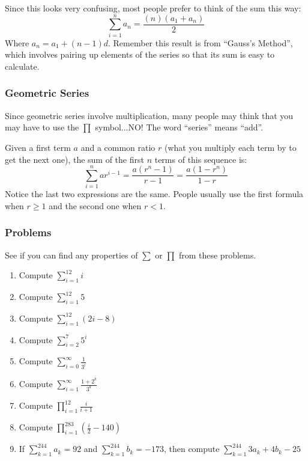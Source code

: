 			Since this looks very confusing, most people prefer to think of the sum this way:
			\begin{equation}
			    \sum\limits_{i=1}^{n} a_{n}= \frac{(n)(a_1+a_n)}{2}
			\end{equation}
			Where $a_n = a_1+(n-1)d$. Remember this result is from ``Gauss's Method'', which involves pairing up elements of the series so that its sum is easy to calculate.
		\subsubsection{Geometric Series}
			Since geometric series involve multiplication, many people may think that you may have to use the $\prod$ symbol...NO! The word ``series'' means ``add''. \par
			Given a first term $a$ and a common ratio $r$ (what you multiply each term by to get the next one), the sum of the first $n$ terms of this sequence is:
			\begin{equation}
			    \sum\limits_{i=1}^n ar^{i-1} = \frac{a(r^{n}-1)}{r-1} = \frac{a(1-r^{n})}{1-r}
			\end{equation}
			Notice the last two expressions are the same. People usually use the first formula when $r \geq 1$ and the second one when $r<1$.
		\subsubsection{Problems}
			See if you can find any properties of $\sum$ or $\prod$ from these problems.
			\begin{enumerate}
				\item Compute $\sum\limits_{i=1}^{12} i$ 
				\item Compute $\sum\limits_{i=1}^{12} 5$ 
				\item Compute $\sum\limits_{i=1}^{12} (2i-8)$ 
				\item Compute $\sum\limits_{i=2}^{7} 5^i$
				\item Compute $\sum\limits_{i=0}^{\infty} \frac{1}{3^i}$
				\item Compute $\sum\limits_{i=1}^{\infty} \frac{1+2^{k}}{3^{k}}$ 
				\item Compute $\prod\limits_{i=1}^{12} \frac{i}{i+1}$
				\item Compute $\prod\limits_{i=1}^{283} \left( \frac{i}{2} - 140\right)$
				\item If $\sum\limits_{k=1}^{244} a_k = 92$ and $\sum\limits_{k=1}^{244} b_k = -173$, then compute $\sum\limits_{k=1}^{244} 3a_k +4b_k -25$
			\end{enumerate}
